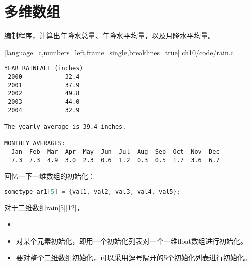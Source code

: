 \section{多维数组}

\begin{frame}[fragile]\ft{\secname} 
编制程序，计算出年降水总量、年降水平均量，以及月降水平均量。
\end{frame}

\begin{frame}\ft{\secname} 

[language=c,numbers=left,frame=single,breaklines=true]
{ch10/code/rain.c}
\end{frame}


\begin{frame}[fragile]\ft{\secname}
\begin{lstlisting}[basicstyle=\ttfamily\scriptsize,backgroundcolor=\color{red!20}]
YEAR RAINFALL (inches)
 2000            32.4
 2001            37.9
 2002            49.8
 2003            44.0 
 2004            32.9

The yearly average is 39.4 inches.

MONTHLY AVERAGES:
  Jan  Feb  Mar  Apr  May  Jun  Jul  Aug  Sep  Oct  Nov  Dec
  7.3  7.3  4.9  3.0  2.3  0.6  1.2  0.3  0.5  1.7  3.6  6.7
\end{lstlisting}
\end{frame}

\begin{frame}[fragile]
回忆一下一维数组的初始化：
\begin{lstlisting}[language=c,backgroundcolor=\color{red!20}]
sometype ar1[5] = {val1, val2, val3, val4, val5};
\end{lstlisting}
\end{frame}

\begin{frame}[fragile]
对于二维数组{\tf rain[5][12]}， \vspace{0.1in}

\begin{itemize}
\item
{}
\\[0.1in]
\item
对某个元素初始化，即用一个初始化列表对一个一维float数组进行初始化。\\[0.1in]
\item 
要对整个二维数组初始化，可以采用逗号隔开的5个初始化列表进行初始化。
\end{itemize}
\end{frame}

